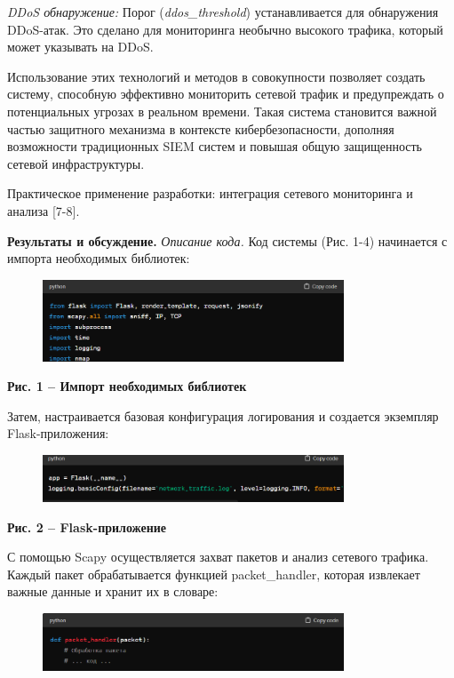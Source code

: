 \emph{DDoS обнаружение:} Порог (\emph{ddos\_threshold}) устанавливается
для обнаружения DDoS-атак. Это сделано для мониторинга необычно высокого
трафика, который может указывать на DDoS.

Использование этих технологий и методов в совокупности позволяет создать
систему, способную эффективно мониторить сетевой трафик и предупреждать
о потенциальных угрозах в реальном времени. Такая система становится
важной частью защитного механизма в контексте кибербезопасности,
дополняя возможности традиционных SIEM систем и повышая общую
защищенность сетевой инфраструктуры.

Практическое применение разработки: интеграция сетевого мониторинга и
анализа {[}7-8{]}.

\textbf{Результаты и обсуждение.} \emph{Описание кода.} Код системы
(Рис. 1-4) начинается с импорта необходимых библиотек:

\begin{figure}[H]
	\centering
	\includegraphics[width=0.8\textwidth]{assets/47}
	\caption*{}
\end{figure}

\textbf{Рис. 1 -- Импорт необходимых библиотек}

Затем, настраивается базовая конфигурация логирования и создается
экземпляр Flask-приложения:

\begin{figure}[H]
	\centering
	\includegraphics[width=0.8\textwidth]{assets/48}
	\caption*{}
\end{figure}

\textbf{Рис. 2 -- Flask-приложение}

С помощью Scapy осуществляется захват пакетов и анализ сетевого трафика.
Каждый пакет обрабатывается функцией packet\_handler, которая извлекает
важные данные и хранит их в словаре:

\begin{figure}[H]
	\centering
	\includegraphics[width=0.8\textwidth]{assets/49}
	\caption*{}
\end{figure}

